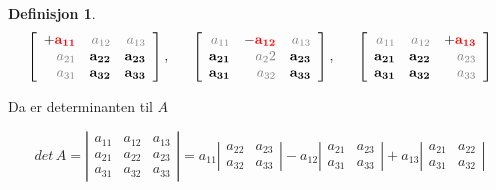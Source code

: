 \documentclass[11pt]{article}
\theoremstyle{definition}
\newtheorem{mindef}{Definisjon}[section]
\theoremstyle{definition}
\theoremstyle{definition}
\theoremstyle{definition}
\theoremstyle{definition}
\theoremstyle{definition}
\begin{document}
\begin{mindef}
			\[\left[\begin{array}{rrr} 
			+\textcolor{red}{\textbf{a}_{\textbf{11}}} & \textcolor{gray}{a_{12}} & \textcolor{gray}{a_{13}} \\
			\textcolor{gray}{a_{21}} & \textbf{a}_{\textbf{22}} & \textbf{a}_{\textbf{23}} \\
			\textcolor{gray}{a_{31}} & \textbf{a}_{\textbf{32}} & \textbf{a}_{\textbf{33}}
			\end{array} \right],\hspace{16pt}\left[\begin{array}{rrr} 
			\textcolor{gray}{a_{11}} & -\textcolor{red}{\textbf{a}_{\textbf{12}}} & \textcolor{gray}{a_{13}} \\
			\textbf{a}_{\textbf{21}} & \textcolor{gray}{a_22} & \textbf{a}_{\textbf{23}} \\
			\textbf{a}_{\textbf{31}} & \textcolor{gray}{a_{32}} & \textbf{a}_{\textbf{33}}
			\end{array} \right]
			,\hspace{16pt}\left[\begin{array}{rrr} 
			\textcolor{gray}{a_{11}} & \textcolor{gray}{a_{12}} & +\textcolor{red}{\textbf{a}_{\textbf{13}}} \\
			\textbf{a}_{\textbf{21}} & \textbf{a}_{\textbf{22}} & \textcolor{gray}{{a}_{23}} \\
			\textbf{a}_{\textbf{31}} & \textbf{a}_{\textbf{32}} & \textcolor{gray}{a_{33}}
			\end{array} \right]\]
			
			Da er determinanten til \(A\)
			
			\[det\,A=\left|\begin{array}{rrr} 
			a_{11} & a_{12} & a_{13} \\
			a_{21} & a_{22} & a_{23} \\
			a_{31} & a_{32} & a_{33}
			\end{array} \right|=a_{11}\left|\begin{array}{rr} 
			a_{22} & a_{23}  \\
			a_{32} & a_{33} 
			\end{array} \right| - a_{12}\left|\begin{array}{rr} 
			a_{21} & a_{23} \\
			a_{31} & a_{33}
			\end{array} \right|+a_{13}\left|\begin{array}{rr} 
			a_{21} & a_{22} \\
			a_{31} & a_{32}
			\end{array} \right|
			\]
		

\end{mindef}
\end{document}
